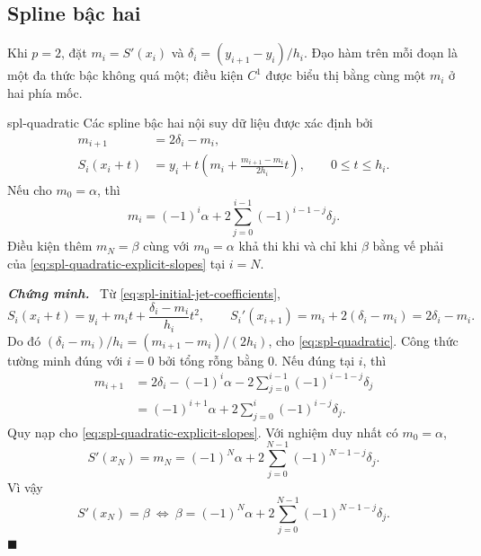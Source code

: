 \documentclass[12pt,a4paper,oneside]{book}
\numberwithin{algorithm}{chapter}
\theoremstyle{definition}
\newenvironment{chungminh}{\par\medskip\noindent\textbf{\textit{\color{mainblue}Chứng minh.}}\ }{\hfill$\blacksquare$\par\medskip}
\begin{document}
\subsection{Spline bậc hai}
Khi $p=2$, đặt $m_i=S'(x_i)$ và $\delta_i=(y_{i+1}-y_i)/h_i$. Đạo hàm trên mỗi đoạn là một đa thức bậc không quá một; điều kiện $C^1$ được biểu thị bằng cùng một $m_i$ ở hai phía mốc.
\begin{menhde}{}{spl-quadratic}
Các spline bậc hai nội suy dữ liệu được xác định bởi
\begin{equation}\label{eq:spl-quadratic}
 \begin{aligned}
 m_{i+1}&=2\delta_i-m_i,\\
 S_i(x_i+t)&=y_i+t\left(m_i+\frac{m_{i+1}-m_i}{2h_i}t\right),
 \qquad0\leq t\leq h_i.
 \end{aligned}
\end{equation}
Nếu cho $m_0=\alpha$, thì
\begin{equation}\label{eq:spl-quadratic-explicit-slopes}
 m_i=(-1)^i\alpha+2\sum_{j=0}^{i-1}(-1)^{i-1-j}\delta_j.
\end{equation}
Điều kiện thêm $m_N=\beta$ cùng với $m_0=\alpha$ khả thi khi và chỉ khi $\beta$ bằng vế phải của \eqref{eq:spl-quadratic-explicit-slopes} tại $i=N$.
\end{menhde}
\begin{chungminh}
Từ \eqref{eq:spl-initial-jet-coefficients},
\[
 S_i(x_i+t)=y_i+m_it+\frac{\delta_i-m_i}{h_i}t^2,
 \qquad S_i'(x_{i+1})=m_i+2(\delta_i-m_i)=2\delta_i-m_i.
\]
Do đó $(\delta_i-m_i)/h_i=(m_{i+1}-m_i)/(2h_i)$, cho \eqref{eq:spl-quadratic}. Công thức tường minh đúng với $i=0$ bởi tổng rỗng bằng $0$. Nếu đúng tại $i$, thì
\begin{align*}
 m_{i+1}&=2\delta_i-(-1)^i\alpha
       -2\sum_{j=0}^{i-1}(-1)^{i-1-j}\delta_j\\
 &=(-1)^{i+1}\alpha+2\sum_{j=0}^{i}(-1)^{i-j}\delta_j.
\end{align*}
Quy nạp cho \eqref{eq:spl-quadratic-explicit-slopes}. Với nghiệm duy nhất có $m_0=\alpha$,
\[
 S'(x_N)=m_N=(-1)^N\alpha+
 2\sum_{j=0}^{N-1}(-1)^{N-1-j}\delta_j.
\]
Vì vậy
\[
 S'(x_N)=\beta
 \ \Longleftrightarrow\
 \beta=(-1)^N\alpha+2\sum_{j=0}^{N-1}(-1)^{N-1-j}\delta_j.
\]
\end{chungminh}
\end{document}
